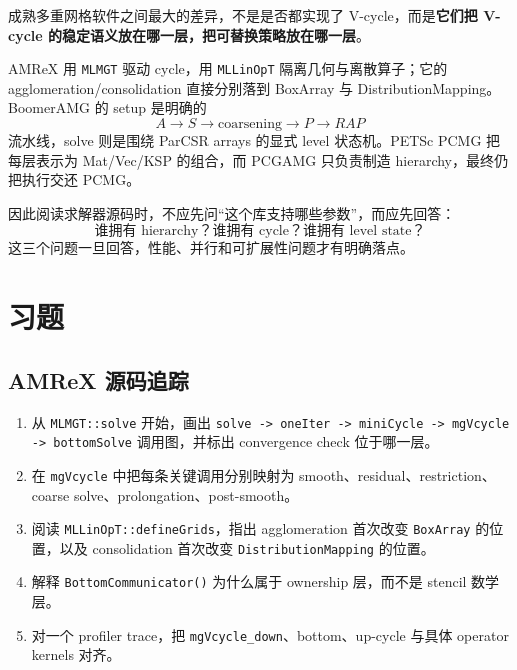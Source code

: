 成熟多重网格软件之间最大的差异，不是是否都实现了 V-cycle，而是\textbf{它们把 V-cycle 的稳定语义放在哪一层，把可替换策略放在哪一层}。

AMReX 用 \texttt{MLMGT} 驱动 cycle，用 \texttt{MLLinOpT} 隔离几何与离散算子；它的 agglomeration/consolidation 直接分别落到 BoxArray 与 DistributionMapping。BoomerAMG 的 setup 是明确的
\[
A\rightarrow S\rightarrow\text{coarsening}\rightarrow P\rightarrow RAP
\]
流水线，solve 则是围绕 ParCSR arrays 的显式 level 状态机。PETSc PCMG 把每层表示为 Mat/Vec/KSP 的组合，而 PCGAMG 只负责制造 hierarchy，最终仍把执行交还 PCMG。

因此阅读求解器源码时，不应先问“这个库支持哪些参数”，而应先回答：
\[
\boxed{
\text{谁拥有 hierarchy？谁拥有 cycle？谁拥有 level state？}
}
\]
这三个问题一旦回答，性能、并行和可扩展性问题才有明确落点。

\section*{习题}

\subsection*{AMReX 源码追踪}
\begin{enumerate}[label=\arabic*.]
\item 从 \texttt{MLMGT::solve} 开始，画出
\texttt{solve -> oneIter -> miniCycle -> mgVcycle -> bottomSolve}
调用图，并标出 convergence check 位于哪一层。
\item 在 \texttt{mgVcycle} 中把每条关键调用分别映射为
smooth、residual、restriction、coarse solve、prolongation、post-smooth。
\item 阅读 \texttt{MLLinOpT::defineGrids}，指出 agglomeration 首次改变 \texttt{BoxArray} 的位置，以及 consolidation 首次改变 \texttt{DistributionMapping} 的位置。
\item 解释 \texttt{BottomCommunicator()} 为什么属于 ownership 层，而不是 stencil 数学层。
\item 对一个 profiler trace，把 \texttt{mgVcycle\_down}、bottom、up-cycle 与具体 operator kernels 对齐。
\end{enumerate}

